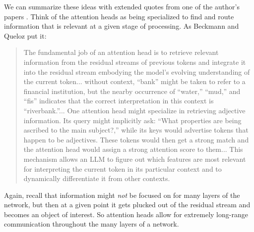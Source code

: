 We can summarize these ideas with extended quotes from one of the author's papers \cite{beckmann2025mechanistic}. Think of the attention heads as being specialized to find and route information that is relevant at a given stage of processing. As Beckmann and Queloz put it:
\begin{quote}
The fundamental job of an attention head is to retrieve relevant information from the residual streams of previous tokens and integrate it into the residual stream embodying the model’s evolving understanding of the current token... without context, ``bank'' might be taken to refer to a financial institution, but the nearby occurrence of ``water,'' ``mud,'' and ``fis'' indicates that the correct interpretation in this context is ``riverbank.''... One attention head might specialize in retrieving adjective information. Its query might implicitly ask: ``What properties are being ascribed to the main subject?,'' while its keys would advertise tokens that happen to be adjectives. These tokens would then get a strong match and the attention head would assign a strong attention score to them... This mechanism allows an LLM to figure out which features are most relevant for interpreting the current token in its particular context and to dynamically differentiate it from other contexts.
\end{quote}
Again, recall that information might \emph{not} be focused on for many layers of the network, but then at a given point it gets plucked out of the residual stream and becomes an object of interest. So attention heads allow for extremely long-range communication throughout the many layers of a network.

